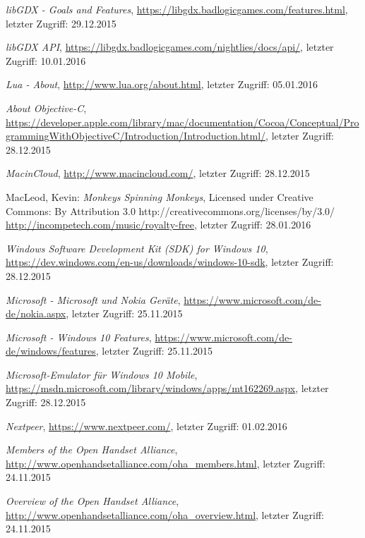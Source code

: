 \begin{thebibliography}{}
\emph{libGDX - Goals and Features},
\url{https://libgdx.badlogicgames.com/features.html}, letzter Zugriff: 29.12.2015

\emph{libGDX API},
\url{https://libgdx.badlogicgames.com/nightlies/docs/api/}, letzter Zugriff: 10.01.2016

\emph{Lua - About},
\url{http://www.lua.org/about.html}, letzter Zugriff: 05.01.2016

\emph{About Objective-C},
\url{https://developer.apple.com/library/mac/documentation/Cocoa/Conceptual/ProgrammingWithObjectiveC/Introduction/Introduction.html/}, letzter Zugriff: 28.12.2015

\emph{MacinCloud},
\url{http://www.macincloud.com/}, letzter Zugriff: 28.12.2015

MacLeod, Kevin:
\emph{Monkeys Spinning Monkeys},
Licensed under Creative Commons: By Attribution 3.0
http://creativecommons.org/licenses/by/3.0/
\url{http://incompetech.com/music/royalty-free}, letzter Zugriff: 28.01.2016

\emph{Windows Software Development Kit (SDK) for Windows 10},
\url{https://dev.windows.com/en-us/downloads/windows-10-sdk}, letzter Zugriff: 28.12.2015

\emph{Microsoft - Microsoft und Nokia Geräte},
\url{https://www.microsoft.com/de-de/nokia.aspx}, letzter Zugriff: 25.11.2015

\emph{Microsoft - Windows 10 Features},
\url{https://www.microsoft.com/de-de/windows/features}, letzter Zugriff: 25.11.2015

\emph{Microsoft-Emulator für Windows 10 Mobile},
\url{https://msdn.microsoft.com/library/windows/apps/mt162269.aspx}, letzter Zugriff: 28.12.2015

\emph{Nextpeer},
\url{https://www.nextpeer.com/}, letzter Zugriff: 01.02.2016

\emph{Members of the Open Handset Alliance},
\url{http://www.openhandsetalliance.com/oha_members.html}, letzter Zugriff: 24.11.2015

\emph{Overview of the Open Handset Alliance},
\url{http://www.openhandsetalliance.com/oha_overview.html}, letzter Zugriff: 24.11.2015


\end{thebibliography}
